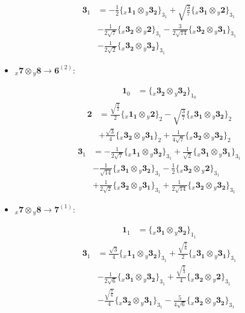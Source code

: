 \documentclass[english]{article}
\newcommand{\rep}[1]{\mathbf{#1}}
\newcommand{\repx}[2]{{}_{#2}\mathbf{#1}}
\newcommand{\tsprodx}[2]{\repx{#1}{x}\otimes\repx{#2}{y}}
\newcommand{\subcgs}[3]{\big\{ \tsprodx{#1}{#2}\big\}^{}_{#3}}
\begin{document}
\begin{itemize}
\begin{fleqn}
\begin{align*}
\end{align*}
\begin{align*}
\rep{3}_{1} & = -\frac{1}{2}\subcgs{1_{1}}{3_{2}}{3_{1}}+\sqrt{\frac{3}{7}}\subcgs{3_{1}}{2}{3_{1}} \\ 
 & -\frac{1}{2 \sqrt{7}}\subcgs{3_{2}}{2}{3_{1}}-\frac{3}{2 \sqrt{14}}\subcgs{3_{2}}{3_{1}}{3_{1}} \\ 
 & -\frac{1}{2 \sqrt{2}}\subcgs{3_{2}}{3_{2}}{3_{1}}
\end{align*}
\end{fleqn}
\item $\tsprodx{7}{8}\to\rep{6}^{(2)}$:
\begin{fleqn}
\begin{align*}
\rep{1}_{0} & = \subcgs{3_{2}}{3_{2}}{1_{0}}
\end{align*}
\begin{align*}
\rep{2} & = \frac{\sqrt{\frac{3}{2}}}{2}\subcgs{1_{1}}{2}{2}-\sqrt{\frac{3}{7}}\subcgs{3_{1}}{3_{2}}{2} \\ 
 & +\frac{\sqrt{3}}{4}\subcgs{3_{2}}{3_{1}}{2}+\frac{1}{4 \sqrt{7}}\subcgs{3_{2}}{3_{2}}{2}
\end{align*}
\begin{align*}
\rep{3}_{1} & = -\frac{1}{2 \sqrt{7}}\subcgs{1_{1}}{3_{2}}{3_{1}}+\frac{1}{\sqrt{2}}\subcgs{3_{1}}{3_{1}}{3_{1}} \\ 
 & -\frac{1}{\sqrt{14}}\subcgs{3_{1}}{3_{2}}{3_{1}}-\frac{1}{2}\subcgs{3_{2}}{2}{3_{1}} \\ 
 & +\frac{1}{2 \sqrt{2}}\subcgs{3_{2}}{3_{1}}{3_{1}}+\frac{1}{2 \sqrt{14}}\subcgs{3_{2}}{3_{2}}{3_{1}}
\end{align*}
\end{fleqn}
\item $\tsprodx{7}{8}\to\rep{7}^{(1)}$:
\begin{fleqn}
\begin{align*}
\rep{1}_{1} & = \subcgs{3_{1}}{3_{2}}{1_{1}}
\end{align*}
\begin{align*}
\rep{3}_{1} & = \frac{\sqrt{3}}{4}\subcgs{1_{1}}{3_{2}}{3_{1}}+\frac{\sqrt{\frac{7}{6}}}{2}\subcgs{3_{1}}{3_{1}}{3_{1}} \\ 
 & -\frac{1}{2 \sqrt{6}}\subcgs{3_{1}}{3_{2}}{3_{1}}+\frac{\sqrt{\frac{7}{3}}}{4}\subcgs{3_{2}}{2}{3_{1}} \\ 
 & -\frac{\sqrt{\frac{7}{6}}}{4}\subcgs{3_{2}}{3_{1}}{3_{1}}-\frac{5}{4 \sqrt{6}}\subcgs{3_{2}}{3_{2}}{3_{1}}
\end{align*}
\begin{align*}

\end{align*}
\end{fleqn}
\end{itemize}
\end{document}
